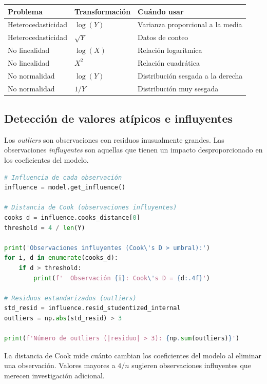 \begin{center}
	\begin{tabular}{|l|l|l|}\hline
		\textbf{Problema} & \textbf{Transformación} & \textbf{Cuándo usar} \\\hline
		Heterocedasticidad & $\log(Y)$ & Varianza proporcional a la media \\\hline
		Heterocedasticidad & $\sqrt{Y}$ & Datos de conteo \\\hline
		No linealidad & $\log(X)$ & Relación logarítmica \\\hline
		No linealidad & $X^2$ & Relación cuadrática \\\hline
		No normalidad & $\log(Y)$ & Distribución sesgada a la derecha \\\hline
		No normalidad & $1/Y$ & Distribución muy sesgada \\\hline
	\end{tabular}
\end{center}

\subsection{Detección de valores atípicos e influyentes}

Los \emph{outliers} son observaciones con residuos inusualmente grandes. Las observaciones \emph{influyentes} son aquellas que tienen un impacto desproporcionado en los coeficientes del modelo.

\begin{lstlisting}[language=Python]
# Influencia de cada observación
influence = model.get_influence()

# Distancia de Cook (observaciones influyentes)
cooks_d = influence.cooks_distance[0]
threshold = 4 / len(Y)

print('Observaciones influyentes (Cook\'s D > umbral):')
for i, d in enumerate(cooks_d):
    if d > threshold:
        print(f'  Observación {i}: Cook\'s D = {d:.4f}')

# Residuos estandarizados (outliers)
std_resid = influence.resid_studentized_internal
outliers = np.abs(std_resid) > 3

print(f'Número de outliers (|residuo| > 3): {np.sum(outliers)}')
\end{lstlisting}

\begin{observacion}
	La distancia de Cook mide cuánto cambian los coeficientes del modelo al eliminar una observación. Valores mayores a $4/n$ sugieren observaciones influyentes que merecen investigación adicional.
\end{observacion}

